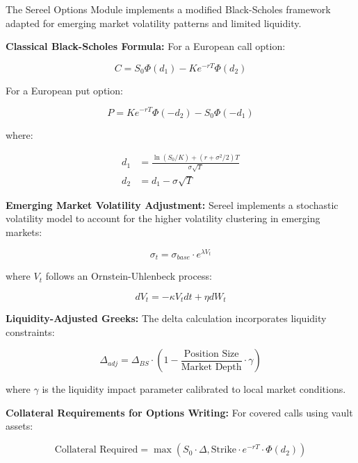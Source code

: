 \documentclass[12pt]{article}
\begin{document}
The Sereel Options Module implements a modified Black-Scholes framework adapted for emerging market volatility patterns and limited liquidity.

\textbf{Classical Black-Scholes Formula:}
For a European call option:

\begin{equation}
C = S_0 \Phi(d_1) - K e^{-rT} \Phi(d_2)
\end{equation}

For a European put option:

\begin{equation}
P = K e^{-rT} \Phi(-d_2) - S_0 \Phi(-d_1)
\end{equation}

where:

\begin{align}
d_1 &= \frac{\ln(S_0/K) + (r + \sigma^2/2)T}{\sigma\sqrt{T}} \\
d_2 &= d_1 - \sigma\sqrt{T}
\end{align}

\textbf{Emerging Market Volatility Adjustment:}
Sereel implements a stochastic volatility model to account for the higher volatility clustering in emerging markets:

\begin{equation}
\sigma_t = \sigma_{base} \cdot e^{\lambda V_t}
\end{equation}

where $V_t$ follows an Ornstein-Uhlenbeck process:

\begin{equation}
dV_t = -\kappa V_t dt + \eta dW_t
\end{equation}

\textbf{Liquidity-Adjusted Greeks:}
The delta calculation incorporates liquidity constraints:

\begin{equation}
\Delta_{adj} = \Delta_{BS} \cdot \left(1 - \frac{\text{Position Size}}{\text{Market Depth}} \cdot \gamma\right)
\end{equation}

where $\gamma$ is the liquidity impact parameter calibrated to local market conditions.

\textbf{Collateral Requirements for Options Writing:}
For covered calls using vault assets:

\begin{equation}
\text{Collateral Required} = \max(S_0 \cdot \Delta, \text{Strike} \cdot e^{-rT} \cdot \Phi(d_2))
\end{equation}
\end{document}
